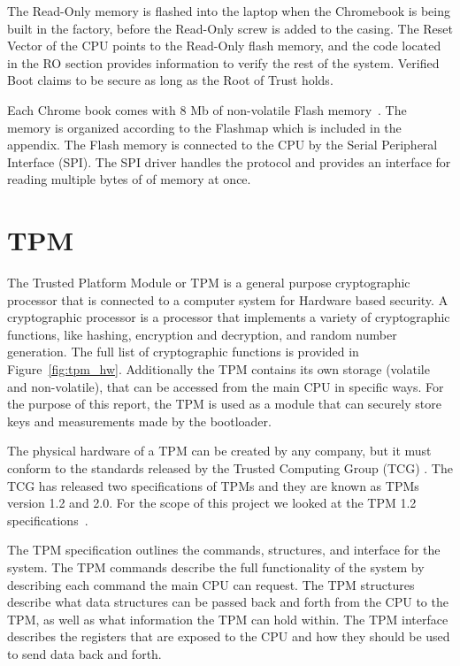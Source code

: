 The Read-Only memory is flashed into the laptop when the Chromebook is being built in the factory, before the Read-Only screw is added to the casing. 
The Reset Vector of the CPU points to the Read-Only flash memory, and the code located in the RO section provides information to verify the rest of the system.
Verified Boot claims to be secure as long as the Root of Trust holds.

Each Chrome book comes with 8 Mb of non-volatile Flash memory~\cite{fw-summit}.
The memory is organized according to the Flashmap which is included in the appendix.
The Flash memory is connected to the CPU by the Serial Peripheral Interface (SPI).
The SPI driver handles the protocol and provides an interface for reading multiple bytes of of memory at once.

\section{TPM}\label{sec:TPM}

The Trusted Platform Module or TPM is a general purpose cryptographic processor that is connected to a computer system for Hardware based security\cite{TPM}.
A cryptographic processor is a processor that implements a variety of
cryptographic functions, like hashing, encryption and decryption, and random
number generation. The full list of cryptographic functions is provided in
Figure~\ref{fig:tpm_hw}.
Additionally the TPM contains its own storage (volatile and non-volatile), that can be accessed from the main CPU in specific ways.
For the purpose of this report, the TPM is used as a module that can securely store keys and measurements made by the bootloader.

The physical hardware of a TPM can be created by any company, but it must conform to the standards released by the Trusted Computing Group (TCG) \cite{TCG}.
The TCG has released two specifications of TPMs and they are known as TPMs version 1.2 and 2.0.
For the scope of this project we looked at the TPM 1.2 specifications~\cite{TPM-design}\cite{TPM-struct}\cite{TPM-cmd}.

The TPM specification outlines the commands, structures, and interface for the system.
The TPM commands describe the full functionality of the system by describing each command the main CPU can request.
The TPM structures describe what data structures can be passed back and forth from the CPU to the TPM, as well as what information the TPM can hold within.
The TPM interface describes the registers that are exposed to the CPU and how they should be used to send data back and forth.


